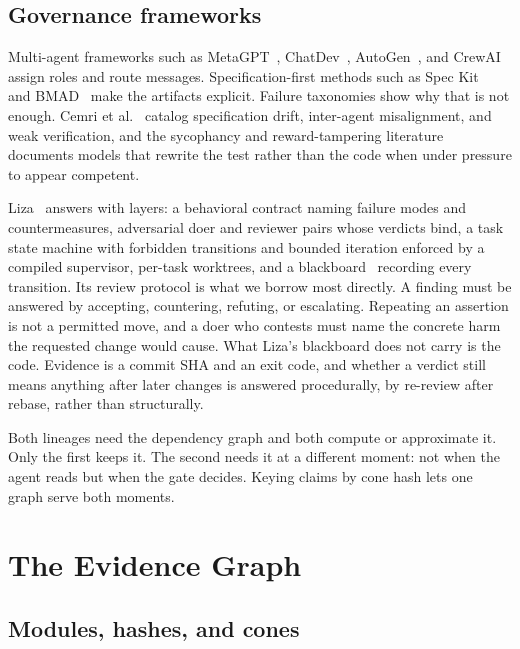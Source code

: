 \documentclass[conference]{IEEEtran}
\begin{document}
\subsection{Governance frameworks}

Multi-agent frameworks such as MetaGPT~\citep{hong2024metagpt}, ChatDev~\citep{qian2024chatdev}, AutoGen~\citep{wu2023autogen}, and CrewAI~\citep{crewai} assign roles and route messages. Specification-first methods such as Spec Kit~\citep{speckit} and BMAD~\citep{bmad} make the artifacts explicit. Failure taxonomies show why that is not enough. Cemri et al.~\citep{cemri2025mast} catalog specification drift, inter-agent misalignment, and weak verification, and the sycophancy and reward-tampering literature~\citep{sharma2024sycophancy,denison2024subterfuge} documents models that rewrite the test rather than the code when under pressure to appear competent.

Liza~\citep{liza} answers with layers: a behavioral contract naming failure modes and countermeasures, adversarial doer and reviewer pairs whose verdicts bind, a task state machine with forbidden transitions and bounded iteration enforced by a compiled supervisor, per-task worktrees, and a blackboard~\citep{nii1986blackboard,erman1980hearsay} recording every transition. Its review protocol is what we borrow most directly. A finding must be answered by accepting, countering, refuting, or escalating. Repeating an assertion is not a permitted move, and a doer who contests must name the concrete harm the requested change would cause. What Liza's blackboard does not carry is the code. Evidence is a commit SHA and an exit code, and whether a verdict still means anything after later changes is answered procedurally, by re-review after rebase, rather than structurally.

Both lineages need the dependency graph and both compute or approximate it. Only the first keeps it. The second needs it at a different moment: not when the agent reads but when the gate decides. Keying claims by cone hash lets one graph serve both moments.

\section{The Evidence Graph}

\subsection{Modules, hashes, and cones}
\end{document}
